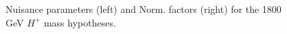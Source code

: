 \begin{figure}[H]
  \centering
  \caption{Nuisance parameters (left) and Norm. factors (right) for the 1800 GeV $H^{+}$ mass hypotheses.}
  \label{fig:Prefit_Hp1800_Blind}
\end{figure}
